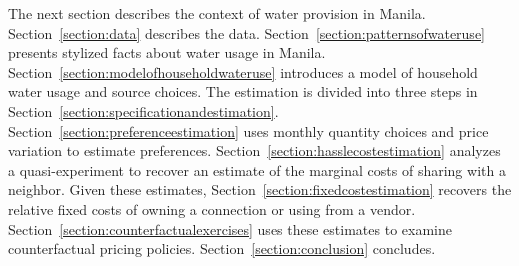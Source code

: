 \documentclass[12pt]{article}
\begin{document}
The next section describes the context of water provision in Manila.  Section~\ref{section:data} describes the data.  Section~\ref{section:patternsofwateruse} presents stylized facts about water usage in Manila.  Section~\ref{section:modelofhouseholdwateruse} introduces a model of household water usage and source choices.  The estimation is divided into three steps in Section~\ref{section:specificationandestimation}.  Section~\ref{section:preferenceestimation} uses monthly quantity choices and price variation to estimate preferences.  Section~\ref{section:hasslecostestimation} analyzes a quasi-experiment to recover an estimate of the marginal costs of sharing with a neighbor.  Given these estimates, Section~\ref{section:fixedcostestimation} recovers the relative fixed costs of owning a connection or using from a vendor.  Section~\ref{section:counterfactualexercises} uses these estimates to examine counterfactual pricing policies.  Section~\ref{section:conclusion} concludes.



\end{document}
